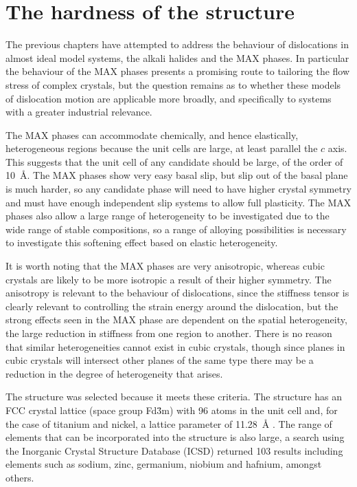 

\chapter{\texorpdfstring{The hardness of the  structure}{The hardness of the Ti2Ni structure}}
\graphicspath{{hardness_of_ti_2_ni/Figs/}}
\label{chap:ti2ni_hardness}



The previous chapters have attempted to address the behaviour of dislocations in almost ideal model systems, the alkali halides and the MAX phases. In particular the behaviour of the MAX phases presents a promising route to tailoring the flow stress of complex crystals, but the question remains as to whether these models of dislocation motion are applicable more broadly, and specifically to systems with a greater industrial relevance. 

The MAX phases can accommodate chemically, and hence elastically, heterogeneous regions because the unit cells are large, at least parallel the $c$ axis. This suggests that the unit cell of any candidate should be large, of the order of \SI{10}{\angstrom}. The MAX phases show very easy basal slip, but slip out of the basal plane is much harder, so any candidate phase will need to have higher crystal symmetry and must have enough independent slip systems to allow full plasticity. The MAX phases also allow a large range of heterogeneity to be investigated due to the wide range of stable compositions, so a range of alloying possibilities is necessary to investigate this softening effect based on elastic heterogeneity. 

It is worth noting that the MAX phases are very anisotropic, whereas cubic crystals are likely to be more isotropic a result of their higher symmetry. The anisotropy is relevant to the behaviour of dislocations, since the stiffness tensor is clearly relevant to controlling the strain energy around the dislocation, but the strong effects seen in the MAX phase are dependent on the spatial heterogeneity, the large reduction in stiffness from one region to another. There is no reason that similar heterogeneities cannot exist in cubic crystals, though since planes in cubic crystals will intersect other planes of the same type there may be a reduction in the degree of heterogeneity that arises.

The  structure was selected because it meets these criteria. The structure has an FCC crystal lattice (space group Fd\={3}m) with 96 atoms in the unit cell and, for the case of titanium and nickel, a lattice parameter of \SI{11.28}{\angstrom} \cite{Yurko1959,Yurko1962}. The range of elements that can be incorporated into the structure is also large, a search using the Inorganic Crystal Structure Database (ICSD) \cite{ICSD} returned 103 results including elements such as sodium, zinc, germanium, niobium and hafnium, amongst others.


